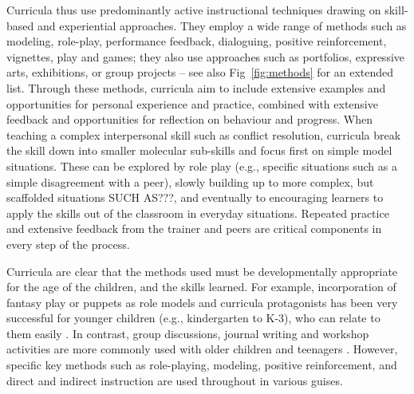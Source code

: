 \documentclass[prodmode,acmtochi]{acmsmall}
\begin{document}

  

Curricula thus use predominantly active instructional techniques drawing on skill-based and experiential approaches. They employ a wide range of methods such as modeling, role-play, performance feedback, dialoguing, positive reinforcement, vignettes, play and games; they also use approaches such as portfolios, expressive arts, exhibitions, or group projects -- see also Fig~\ref{fig:methods} for an extended list. Through these methods, curricula aim to include extensive examples and opportunities for personal experience and practice, combined with extensive feedback and opportunities for reflection on behaviour and progress. When teaching a complex interpersonal skill such as conflict resolution, curricula break the skill down into smaller molecular sub-skills and focus first on simple model situations. These can be explored by role play (e.g., specific situations such as a simple disagreement with a peer), slowly building up to more complex, but scaffolded situations SUCH AS???, and eventually to encouraging learners to apply the skills out of the classroom in everyday situations. Repeated practice and extensive feedback from the trainer and peers are critical components in every step of the process. 

Curricula are clear that the methods used must be developmentally appropriate for the age of the children, and the skills learned. For example, incorporation of fantasy play or puppets as role models and curricula protagonists has been very successful for younger children (e.g., kindergarten to K-3), who can relate to them easily  \cite{Webster-Stratton2004}. In contrast, group discussions, journal writing and workshop activities are more commonly used with older children and teenagers \cite{dejong1994}. However, specific key methods such as role-playing, modeling, positive reinforcement, and direct and indirect instruction are used throughout in various guises. 
\end{document}
